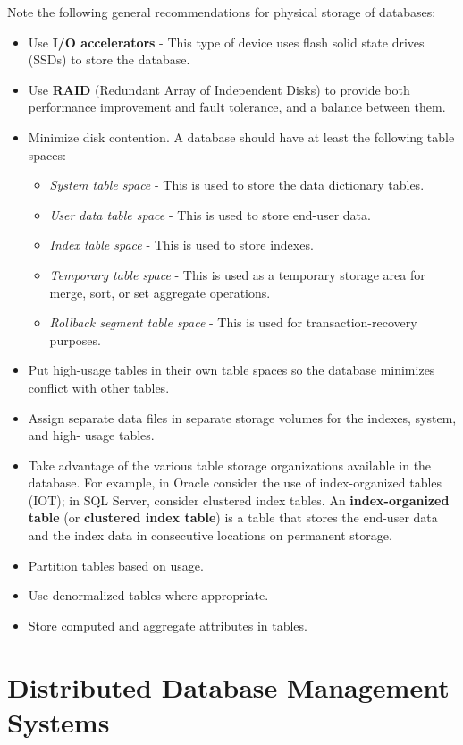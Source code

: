 \documentclass[a4paper, 11pt, titlepage]{report}
\begin{document}
Note the following general recommendations for physical storage of databases:
\begin{itemize}
\item Use \textbf{I/O accelerators} - This type of device uses flash solid state drives (SSDs) to store
the database.
\item Use \textbf{RAID} (Redundant Array of Independent Disks) to provide both performance improvement and fault tolerance, and a balance between them.
\item Minimize disk contention. A database should have at least the following table spaces:
\begin{itemize}
\item \textit{System table space} - This is used to store the data dictionary tables.
\item \textit{User data table space} - This is used to store end-user data. 
\item \textit{Index table space} - This is used to store indexes. 
\item \textit{Temporary table space} - This is used as a temporary storage area for merge, sort,
or set aggregate operations.
\item \textit{Rollback segment table space} - This is used for transaction-recovery purposes.
\end{itemize}
\item Put high-usage tables in their own table spaces so the database minimizes conflict
with other tables.
\item Assign separate data files in separate storage volumes for the indexes, system, and high-
usage tables.
\item Take advantage of the various table storage organizations available in the database. For example, in Oracle consider the use of index-organized tables (IOT); in SQL Server, consider clustered index tables. An \textbf{index-organized table} (or \textbf{clustered index table}) is a table that stores the end-user data and the index data in consecutive locations on permanent storage.
\item Partition tables based on usage.
\item Use denormalized tables where appropriate.
\item Store computed and aggregate attributes in tables.
\end{itemize}
\chapter{Distributed Database Management Systems}
\end{document}
